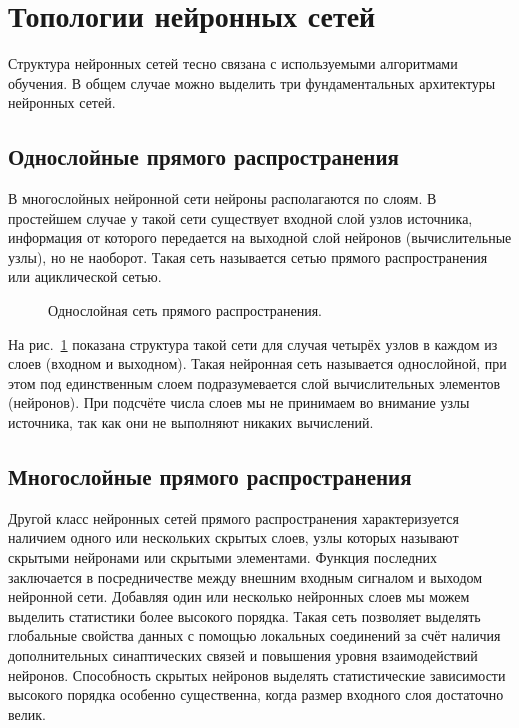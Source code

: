 \section{Топологии нейронных сетей}

Структура нейронных сетей тесно связана с используемыми алгоритмами обучения.
В общем случае можно выделить три фундаментальных архитектуры нейронных сетей.

\subsection{Однослойные прямого распространения}

В многослойных нейронной сети нейроны располагаются по слоям.
В простейшем случае у такой сети существует входной слой узлов источника, информация от которого передается на выходной слой нейронов (вычислительные узлы), но не наоборот. 
Такая сеть называется сетью прямого распространения или ациклической сетью.
\begin{figure}[h]
\caption{Однослойная сеть прямого распространения.}
\label{ris:OneLayer}
\end{figure}

На рис.~\ref{ris:OneLayer} показана структура такой сети для случая четырёх узлов в каждом из слоев (входном и выходном).
Такая нейронная сеть называется однослойной, при этом под единственным слоем подразумевается слой вычислительных элементов (нейронов).
При подсчёте числа слоев мы не принимаем во внимание узлы источника, так как они не выполняют никаких вычислений.\cite{NejronnyeSeti}

\subsection{Многослойные прямого распространения}

Другой класс нейронных сетей прямого распространения  характеризуется наличием одного или нескольких скрытых слоев, узлы которых называют скрытыми нейронами или скрытыми элементами.
Функция последних заключается в посредничестве между внешним входным сигналом и выходом нейронной сети.
Добавляя один или несколько нейронных слоев мы можем выделить статистики более высокого порядка.
Такая сеть позволяет выделять глобальные свойства данных с помощью локальных соединений за счёт наличия дополнительных синаптических связей  и повышения уровня взаимодействий нейронов.
Способность скрытых нейронов выделять статистические зависимости высокого порядка особенно существенна, когда размер входного слоя достаточно велик.

